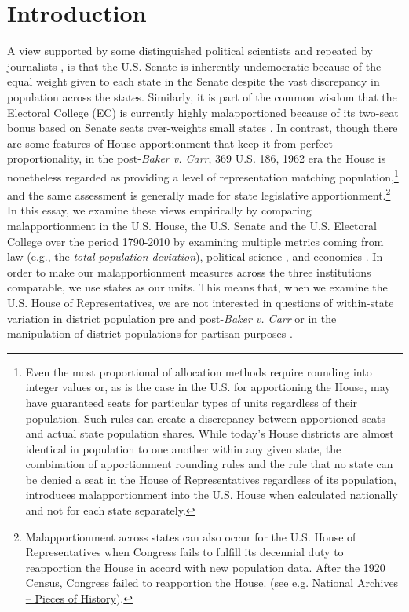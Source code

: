  \section{Introduction} \label{sec:intro}
% 
A view supported by some distinguished political scientists \cite[see e.g.,][]{LeeOppenheimer1999, Dahl2003} and repeated by journalists \citep[see e.g.,][]{Badger2016}, is that the U.S. Senate is inherently undemocratic because of the equal weight given to each state in the Senate despite the vast discrepancy in population across the states. Similarly, it is part of the common wisdom that the Electoral College (EC) is currently highly malapportioned because of its two-seat bonus based on Senate seats over-weights small states \citep[see e.g.,][]{Toles2018}. In contrast, though there are some features of House apportionment that keep it from perfect proportionality, in the post-\textit{Baker v. Carr}, 369 U.S. 186, 1962 era \citep{LadewigJasinski2008, LadewigMcKee2014} the House is nonetheless regarded as providing a level of representation matching population,\footnote{Even the most proportional of allocation methods require rounding into integer values or, as is the case in the U.S. for apportioning the House, may have guaranteed seats for particular types of units regardless of their population. Such rules can create a discrepancy between apportioned seats and actual state population shares. While today's House districts are almost identical in population to one another within any given state, the combination of apportionment rounding rules \citep[the so-called integer allocation problem,][]{Balinski1982} and the rule that no state can be denied a seat in the House of Representatives regardless of its population, introduces malapportionment into the U.S. House when calculated nationally and not for each state separately.} and the same assessment is generally made for state legislative apportionment.\footnote{Malapportionment across states can also occur for the U.S. House of Representatives when Congress fails to fulfill its decennial duty to reapportion the House in accord with new population data. After the 1920 Census, Congress failed to reapportion the House. (see e.g. \href{https://prologue.blogs.archives.gov/2015/03/01/congress-counts-history-of-the-us-census/}{National Archives -- Pieces of History}).} In this essay, we examine these views empirically by comparing malapportionment in the U.S. House, the U.S. Senate and the U.S. Electoral College over the period 1790-2010 by examining multiple metrics coming from law (e.g., the \textit{total population deviation}), political science \citep[e.g., the \textit{Gallagher Index},][and the \textit{Loosemore-Hanby Index}, \citealt{Loosemore1971}]{Gallagher1991}, and economics \cite[e.g., the \textit{Gini coefficient},][]{Lorenz1905}. In order to make our malapportionment measures across the three institutions comparable, we use states as our units. This means that, when we examine the U.S. House of Representatives, we are not interested in questions of within-state variation in district population pre and post-\textit{Baker v. Carr} or in the manipulation of district populations for partisan purposes \citep{Grofman1990, Engstrom2013, McGann_et_al_2016_gerrymandering}.

